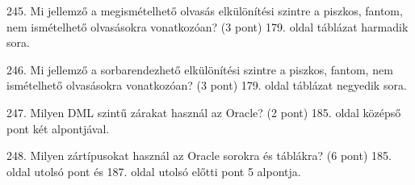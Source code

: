 \documentclass[a4paper,11.5pt, table]{article}
\begin{document}
245. Mi jellemző a megismételhető olvasás elkülönítési szintre a piszkos, fantom, nem ismételhető olvasásokra vonatkozóan? (3 pont)
179. oldal táblázat harmadik sora.

246. Mi jellemző a sorbarendezhető elkülönítési szintre a piszkos, fantom, nem ismételhető olvasásokra vonatkozóan? (3 pont)
 179. oldal táblázat negyedik sora.

247. Milyen DML szintű zárakat használ az Oracle? (2 pont)
 185. oldal középső pont két alpontjával.

248. Milyen zártípusokat használ az Oracle sorokra és táblákra? (6 pont)
185. oldal utolsó pont és 187. oldal utolsó előtti pont 5 alpontja.
\end{document}
